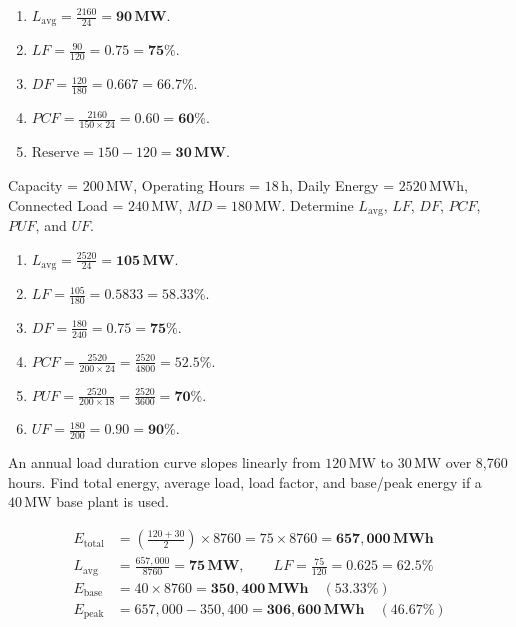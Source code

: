 \documentclass[11pt,a4paper]{article}
\newenvironment{Problem}[1][Numerical Problem]{\begin{tcolorbox}[problembox, title=#1]}{\end{tcolorbox}}
\newenvironment{Solution}[1][Step-by-Step Solution]{\begin{tcolorbox}[solbox, title=#1]}{\end{tcolorbox}}
\begin{document}
\begin{Solution}
\begin{enumerate}
  \item $L_{\text{avg}} = \frac{2160}{24} = \mathbf{90\,\text{MW}}$.
  \item $LF = \frac{90}{120} = \mathbf{0.75} = \mathbf{75\%}$.
  \item $DF = \frac{120}{180} = \mathbf{0.667} = \mathbf{66.7\%}$.
  \item $PCF = \frac{2160}{150 \times 24} = \mathbf{0.60} = \mathbf{60\%}$.
  \item $\text{Reserve} = 150 - 120 = \mathbf{30\,\text{MW}}$.
\end{enumerate}
\end{Solution}

\begin{Problem}[Problem 10: Complete Operational Analysis]
Capacity = $200\,\text{MW}$, Operating Hours = $18\,\text{h}$, Daily Energy = $2520\,\text{MWh}$, Connected Load = $240\,\text{MW}$, $MD = 180\,\text{MW}$. Determine $L_{\text{avg}}$, $LF$, $DF$, $PCF$, $PUF$, and $UF$.
\end{Problem}

\begin{Solution}
\begin{enumerate}
  \item $L_{\text{avg}} = \frac{2520}{24} = \mathbf{105\,\text{MW}}$.
  \item $LF = \frac{105}{180} = \mathbf{0.5833} = \mathbf{58.33\%}$.
  \item $DF = \frac{180}{240} = \mathbf{0.75} = \mathbf{75\%}$.
  \item $PCF = \frac{2520}{200 \times 24} = \frac{2520}{4800} = \mathbf{52.5\%}$.
  \item $PUF = \frac{2520}{200 \times 18} = \frac{2520}{3600} = \mathbf{70\%}$.
  \item $UF = \frac{180}{200} = \mathbf{0.90} = \mathbf{90\%}$.
\end{enumerate}
\end{Solution}

\begin{Problem}[Problem 11: Linear Load Duration Curve Integration]
An annual load duration curve slopes linearly from $120\,\text{MW}$ to $30\,\text{MW}$ over 8,760 hours. Find total energy, average load, load factor, and base/peak energy if a $40\,\text{MW}$ base plant is used.
\end{Problem}

\begin{Solution}
\begin{align*}
  E_{\text{total}} &= \left(\frac{120 + 30}{2}\right) \times 8760 = 75 \times 8760 = \mathbf{657,000\,\text{MWh}} \\
  L_{\text{avg}} &= \frac{657,000}{8760} = \mathbf{75\,\text{MW}}, \qquad LF = \frac{75}{120} = \mathbf{0.625} = \mathbf{62.5\%} \\
  E_{\text{base}} &= 40 \times 8760 = \mathbf{350,400\,\text{MWh}} \quad (53.33\%) \\
  E_{\text{peak}} &= 657,000 - 350,400 = \mathbf{306,600\,\text{MWh}} \quad (46.67\%)
\end{align*}
\end{Solution}
\end{document}
